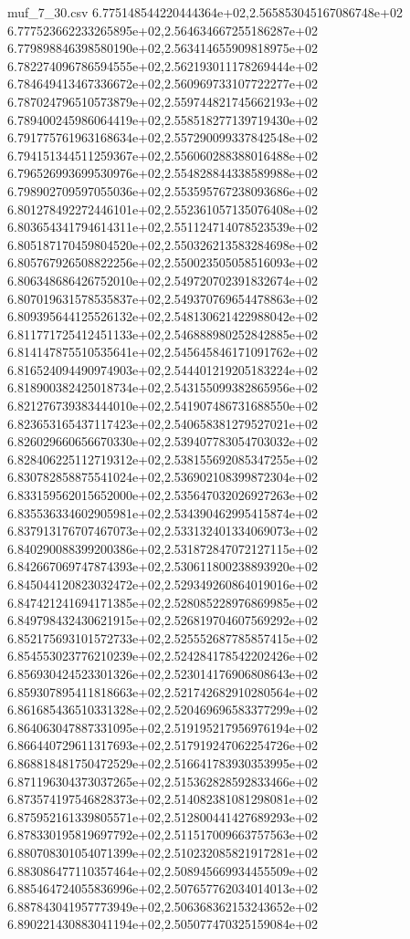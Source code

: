 \begin{filecontents*}{muf_7_30.csv}
6.775148544220444364e+02,2.565853045167086748e+02
6.777523662233265895e+02,2.564634667255186287e+02
6.779898846398580190e+02,2.563414655909818975e+02
6.782274096786594555e+02,2.562193011178269444e+02
6.784649413467336672e+02,2.560969733107722277e+02
6.787024796510573879e+02,2.559744821745662193e+02
6.789400245986064419e+02,2.558518277139719430e+02
6.791775761963168634e+02,2.557290099337842548e+02
6.794151344511259367e+02,2.556060288388016488e+02
6.796526993699530976e+02,2.554828844338589988e+02
6.798902709597055036e+02,2.553595767238093686e+02
6.801278492272446101e+02,2.552361057135076408e+02
6.803654341794614311e+02,2.551124714078523539e+02
6.805187170459804520e+02,2.550326213583284698e+02
6.805767926508822256e+02,2.550023505058516093e+02
6.806348686426752010e+02,2.549720702391832674e+02
6.807019631578535837e+02,2.549370769654478863e+02
6.809395644125526132e+02,2.548130621422988042e+02
6.811771725412451133e+02,2.546888980252842885e+02
6.814147875510535641e+02,2.545645846171091762e+02
6.816524094490974903e+02,2.544401219205183224e+02
6.818900382425018734e+02,2.543155099382865956e+02
6.821276739383444010e+02,2.541907486731688550e+02
6.823653165437117423e+02,2.540658381279527021e+02
6.826029660656670330e+02,2.539407783054703032e+02
6.828406225112719312e+02,2.538155692085347255e+02
6.830782858875541024e+02,2.536902108399872304e+02
6.833159562015652000e+02,2.535647032026927263e+02
6.835536334602905981e+02,2.534390462995415874e+02
6.837913176707467073e+02,2.533132401334069073e+02
6.840290088399200386e+02,2.531872847072127115e+02
6.842667069747874393e+02,2.530611800238893920e+02
6.845044120823032472e+02,2.529349260864019016e+02
6.847421241694171385e+02,2.528085228976869985e+02
6.849798432430621915e+02,2.526819704607569292e+02
6.852175693101572733e+02,2.525552687785857415e+02
6.854553023776210239e+02,2.524284178542202426e+02
6.856930424523301326e+02,2.523014176906808643e+02
6.859307895411818663e+02,2.521742682910280564e+02
6.861685436510331328e+02,2.520469696583377299e+02
6.864063047887331095e+02,2.519195217956976194e+02
6.866440729611317693e+02,2.517919247062254726e+02
6.868818481750472529e+02,2.516641783930353995e+02
6.871196304373037265e+02,2.515362828592833466e+02
6.873574197546828373e+02,2.514082381081298081e+02
6.875952161339805571e+02,2.512800441427689293e+02
6.878330195819697792e+02,2.511517009663757563e+02
6.880708301054071399e+02,2.510232085821917281e+02
6.883086477110357464e+02,2.508945669934455509e+02
6.885464724055836996e+02,2.507657762034014013e+02
6.887843041957773949e+02,2.506368362153243652e+02
6.890221430883041194e+02,2.505077470325159084e+02

\end{filecontents*}
